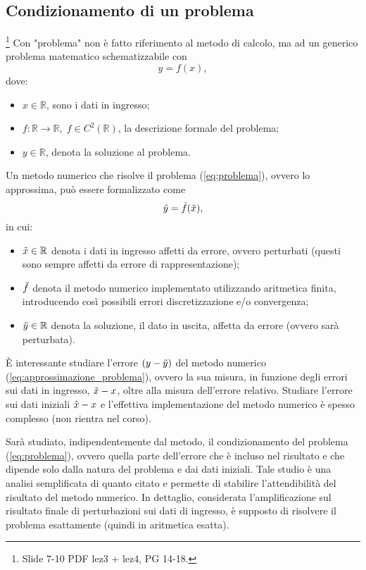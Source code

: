 \subsection{Condizionamento di un problema}\footnote{Slide 7-10 PDF lez3 + lez4, PG 14-18.}
Con "problema" non è fatto riferimento al metodo di calcolo, ma ad un generico problema matematico schematizzabile con 
\begin{equation}\label{eq:problema}
	y=f(x),
\end{equation}
dove:
\begin{itemize}
	\item $x\in\mathbb R$, sono i dati in ingresso;
	\item $f:\mathbb R\rightarrow\mathbb R,\; f\in C^2(\mathbb{R})$, la descrizione formale del problema;
	\item $y\in\mathbb R$, denota la soluzione al problema.
\end{itemize}

Un metodo numerico che risolve il problema (\ref{eq:problema}), ovvero lo approssima, può essere formalizzato come
\begin{equation}\label{eq:approssimazione_problema}
	\Tilde{y}=\Tilde{f}(\Tilde{x}),
\end{equation}
in cui:
\begin{itemize}
	\item $\Tilde{x}\in\mathbb R$ denota i dati in ingresso affetti da errore, ovvero perturbati (questi sono sempre affetti da errore di rappresentazione);
	\item $\Tilde{f}$ denota il metodo numerico implementato utilizzando aritmetica finita, introducendo così possibili errori discretizzazione e/o convergenza;
	\item $\Tilde{y}\in\mathbb R$ denota la soluzione, il dato in uscita, affetta da errore (ovvero sarà perturbata). 
\end{itemize}

È interessante studiare l'errore $(y-\Tilde{y})$ del metodo numerico (\ref{eq:approssimazione_problema}), ovvero la sua misura, in funzione degli errori sui dati in ingresso, $\Tilde{x} - x$, oltre alla misura dell'errore relativo. Studiare l'errore sui dati iniziali $\Tilde{x} - x$ e l'effettiva implementazione del metodo numerico è spesso complesso (non rientra nel corso).

Sarà studiato, indipendentemente dal metodo, il condizionamento del problema (\ref{eq:problema}), ovvero quella parte dell'errore che è incluso nel risultato e che dipende solo dalla natura del problema e dai dati iniziali. Tale studio è una analisi semplificata di quanto citato e permette di stabilire l'attendibilità del risultato del metodo numerico. In dettaglio, considerata l'amplificazione sul risultato finale di perturbazioni sui dati di ingresso, è supposto di risolvere il problema esattamente (quindi in aritmetica esatta).

